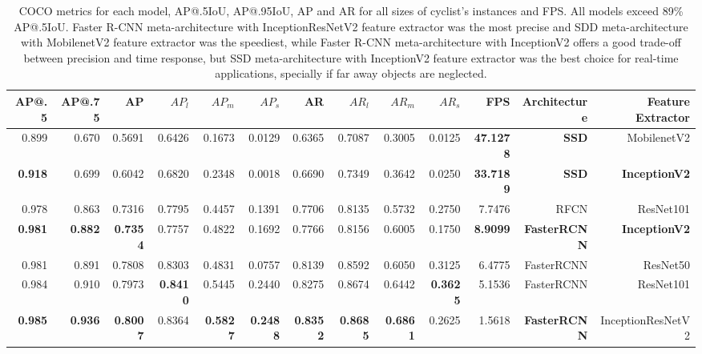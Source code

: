 \documentclass[journal]{IEEEtran}
\begin{document}
\begin{table*}[hb!]
\begin{minipage}[c]{0.95\textwidth}
\caption{COCO metrics for each model, AP@.5IoU, AP@.95IoU, AP and AR for all sizes of cyclist's instances and FPS. All models exceed 89\% AP@.5IoU. Faster R-CNN meta-architecture with InceptionResNetV2 feature extractor was the most precise and SDD meta-architecture with MobilenetV2 feature extractor was the speediest, while Faster R-CNN meta-architecture with InceptionV2 offers a good trade-off between precision and time response, but SSD meta-architecture with InceptionV2 feature extractor was the best choice for real-time applications, specially if far away objects are neglected.
\label{table:Cyclist_AP}}
\end{minipage}
\addtolength{\tabcolsep}{-1pt}
\begin{center}
\begin{tabular}{|rrrrrrrrrrrrr|}
\toprule
AP@.5 &  AP@.75 &       AP &      $AP_{l}$ &      $AP_{m}$ &      $AP_{s}$ &  AR& $AR_{l}$ &    $AR_{m}$ &   $AR_{s}$  & FPS & Architecture &  {Feature Extractor}\\
\midrule
\midrule
0.899 &  0.670 &  0.5691 &  0.6426 &  0.1673 &  0.0129 &  0.6365 &  0.7087 &  0.3005 &  0.0125 &  \textbf{47.1278}&          \textbf{SSD} &        MobilenetV2 \\
\textbf{0.918} &  0.699 &  0.6042 &  0.6820 &  0.2348 &  0.0018 &  0.6690 &  0.7349 &  0.3642 &  0.0250 &  \textbf{33.7189} &          \textbf{SSD} &        \textbf{InceptionV2} \\
0.978 &  0.863 &  0.7316 &  0.7795 &  0.4457 &  0.1391 &  0.7706 &  0.8135 &  0.5732 &  0.2750 &   7.7476 &         RFCN &          ResNet101 \\
\textbf{0.981} &  \textbf{0.882} &  \textbf{0.7354} &  0.7757 &  0.4822&  0.1692 &  0.7766& 0.8156 & 0.6005 &  0.1750&  \textbf{8.9099} &   \textbf{FasterRCNN} &        \textbf{InceptionV2} \\
0.981 &  0.891 &  0.7808 &  0.8303 &  0.4831 &  0.0757 &  0.8139 &  0.8592 &  0.6050 &  0.3125 &  6.4775 &   FasterRCNN &           ResNet50 \\
0.984 &  0.910 &  0.7973 &  \textbf{0.8410} &  0.5445 &  0.2440 &  0.8275 &  0.8674 &  0.6442 &  \textbf{0.3625} &   5.1536 &   FasterRCNN &          ResNet101 \\
\textbf{0.985} &  \textbf{0.936} &  \textbf{0.8007} &  0.8364 &  \textbf{0.5827} &  \textbf{0.2488} &  \textbf{0.8352} &  \textbf{0.8685} &  \textbf{0.6861} &  0.2625 &   1.5618 &   \textbf{FasterRCNN} &  InceptionResNetV2 \\
\bottomrule
\end{tabular}
\end{center}
\end{table*}
\end{document}
